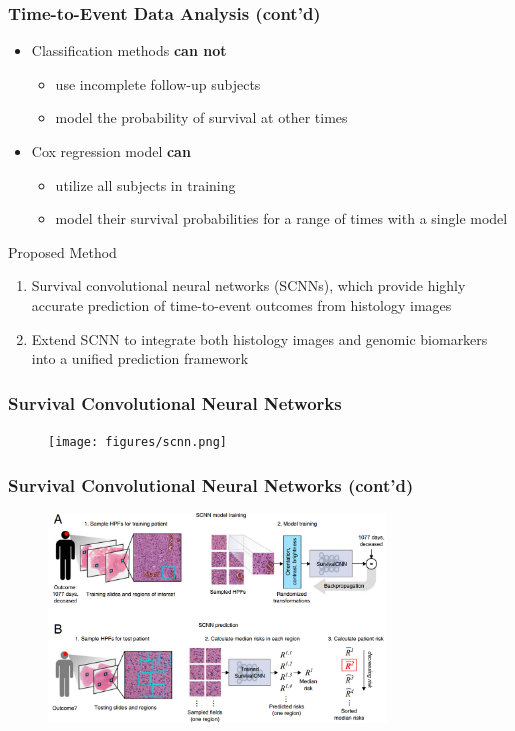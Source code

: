\documentclass[usenames,dvipsnames]{beamer}
\begin{document}
\begin{frame}
  \frametitle{Time-to-Event Data Analysis (cont'd)}
  \begin{itemize}
    \item Classification methods \textbf{can not}
    \begin{itemize}
      \item use incomplete follow-up subjects
      \item model the probability of survival at other times
    \end{itemize}
    \item Cox regression model \textbf{can}
    \begin{itemize}
      \item utilize all subjects in training
      \item model their survival probabilities for a range of times with a single model
    \end{itemize}
  \end{itemize}
  \begin{block}{Proposed Method}
    \begin{enumerate}
      \item Survival convolutional neural networks (SCNNs), which provide highly
      accurate prediction of time-to-event outcomes from histology images
      \item Extend SCNN to integrate both histology images and genomic
        biomarkers into a unified prediction framework
    \end{enumerate}
  \end{block}
\end{frame}
\begin{frame}
  \frametitle{Survival Convolutional Neural Networks}
  \begin{figure}[ht]
    \centering
    \texttt{[image: figures/scnn.png]}
    \caption*{\label{fig:scnn}}
  \end{figure}
\end{frame}
\begin{frame}
  \frametitle{Survival Convolutional Neural Networks (cont'd)}
  \begin{figure}[ht]
    \centering
    \includegraphics[width=0.8\textwidth,keepaspectratio]{figures/scnn2.png}
    \caption*{\label{fig:scnn2}}
  \end{figure}
\end{frame}
\end{document}
